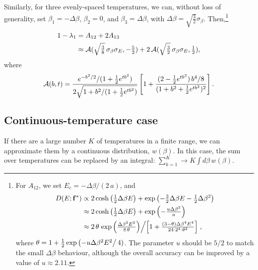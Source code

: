 \documentclass{gMOS2e}
\begin{document}
Similarly,
for three evenly-spaced temperatures,
%
we can, without loss of generality,
 set
$\beta_1 = -\Delta \beta$,
$\beta_2 = 0$,
and
$\beta_3 = \Delta \beta$,
with
$\Delta \beta = \sqrt{\frac 3 2} \sigma_\beta$.
%
Then,\footnote{
%
For $A_{12}$,
we set $E_c = -\Delta \beta/(2 \, a)$,
and
\begin{align*}
D(E; \mathbf{f}^*)
&\propto
2 \cosh\left(
  \tfrac{1}{2} \Delta \beta E
\right)
+
\exp\left(
  -\tfrac{3}{2} \Delta \beta E
  -\tfrac{1}{2} \Delta \beta^2
\right)
\\
&\approx
2 \cosh\left(
  \tfrac{1}{2} \Delta \beta E
\right)
+
\exp\left(
  -\tfrac{ u \Delta \beta^2 }{ a }
\right)
\\
&\approx
2 \, \theta
\left.
  \exp\left(
    \tfrac{\Delta \beta^2 E^2} { 8 \, \theta }
  \right)
\middle/
  \left[
    1
    +
    \tfrac{ (3 - \theta) \Delta \beta^4 E^4 }
    { 24 \cdot 2^4 \cdot \theta^2 }
  \right]
\right.,
\end{align*}
where
$\theta = 1 + \frac 1 2 \exp\left(-u \Delta \beta^2 E^2\right/4)$.
%
The parameter $u$ should be $5/2$
to match the small $\Delta \beta$ behaviour,
although the overall accuracy can be improved
by a value of $u \approx 2.11$.
}
%
\begin{align}
1 - \lambda_1
&= A_{12} + 2 A_{13}
\notag \\
&\approx
\mathcal{A}(\sqrt{\tfrac 3 8} \, \sigma_\beta \sigma_E, -\tfrac 5 2)
+
2 \, \mathcal{A}(\sqrt{\tfrac 3 2} \, \sigma_\beta \sigma_E, \tfrac 1 2),
\label{eq:lambda1_threeT}
\end{align}
where
\begin{align*}
\mathcal{A}(b, t)
=
\frac{
  e^{-b^2/2} / (1 + \frac{1}{2}e^{tb^2})
}
{
  2 \sqrt{1 + b^2/(1 + \frac{1}{2} e^{tb^2})}
}
\left[
  1
  +
  \frac{(2 - \frac{1}{2} e^{tb^2}) \, b^4/8}
  { (1 + b^2 + \frac{1}{2} e^{tb^2})^2 }
\right].
\end{align*}




\subsection{Continuous-temperature case}



If there are a large number $K$ of temperatures
in a finite range,
we can approximate them
by a continuous distribution, $w(\beta)$.
%
In this case,
the sum over temperatures can be
replaced by an integral:
%
$
\sum_{k = 1}^K
\rightarrow
K \int d\beta \, w(\beta).
$
\end{document}

